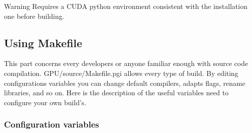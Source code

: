 \begin{DoxyWarning}{Warning}
Requires a C\-U\-D\-A python environment consistent with the installation one before building.
\end{DoxyWarning}
\subsection*{Using Makefile}

This part concerns every developers or anyone familiar enough with source code compilation. {\ttfamily G\-P\-U/source/\-Makefile.\-pgi} allows every type of build. By editing configurations variables you can change default compilers, adapts flags, rename libraries, and so on. Here is the description of the useful variables need to configure your own build's.

\subsubsection*{Configuration variables}


